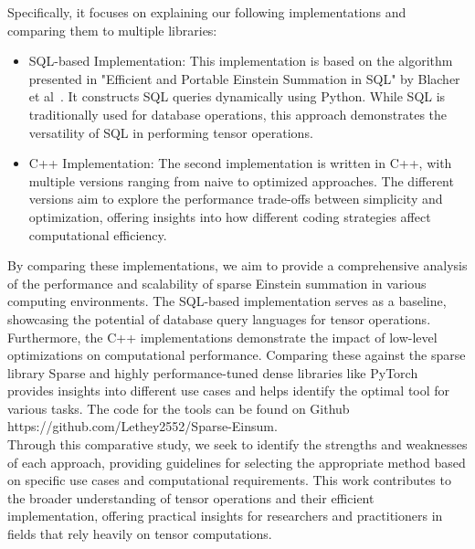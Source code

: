 Specifically, it focuses on explaining our following implementations and comparing them 
to multiple libraries:
%
\begin{itemize}
      \item SQL-based Implementation:
            This implementation is based on the algorithm presented in "Efficient and
            Portable Einstein Summation in SQL" by Blacher et al~\cite{sql_einsum}.
            It constructs SQL queries dynamically using Python. While SQL is
            traditionally used for database operations, this approach demonstrates
            the versatility of SQL in performing tensor operations.
      \item C++ Implementation: The second implementation is written in C++, with multiple
            versions ranging from naive to optimized approaches. The different versions
            aim to explore the performance trade-offs between simplicity and optimization,
            offering insights into how different coding strategies affect computational 
            efficiency.
\end{itemize}
%
%
By comparing these implementations, we aim to provide a comprehensive analysis of 
the performance and scalability of sparse Einstein summation in various
computing environments. The SQL-based implementation serves as a baseline,
showcasing the potential of database query languages for tensor operations.
Furthermore, the C++ implementations demonstrate the impact of low-level optimizations
on computational performance. Comparing these against the sparse library Sparse and
highly performance-tuned dense libraries like PyTorch provides insights into different
use cases and helps identify the optimal tool for various tasks. The code for the tools
can be found on Github https://github.com/Lethey2552/Sparse-Einsum.
\\
Through this comparative study, we seek to identify the strengths and weaknesses
of each approach, providing guidelines for selecting the appropriate
method based on specific use cases and computational requirements. This work
contributes to the broader understanding of tensor operations and their efficient
implementation, offering practical insights for researchers and practitioners
in fields that rely heavily on tensor computations.